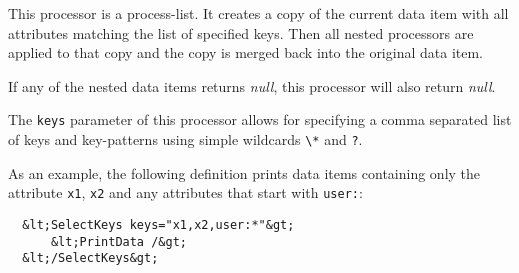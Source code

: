 
This processor is a process-list. It creates a copy of the current data
item with all attributes matching the list of specified keys. Then all
nested processors are applied to that copy and the copy is merged back
into the original data item.

If any of the nested data items returns \emph{null}, this processor will
also return \emph{null}.

The \texttt{keys} parameter of this processor allows for specifying a
comma separated list of keys and key-patterns using simple wildcards
\texttt{\textbackslash{}*} and \texttt{?}.

As an example, the following definition prints data items containing
only the attribute \texttt{x1}, \texttt{x2} and any attributes that
start with \texttt{user:}:

\begin{verbatim}
  &lt;SelectKeys keys="x1,x2,user:*"&gt; 
      &lt;PrintData /&gt;
  &lt;/SelectKeys&gt;
\end{verbatim}


\begin{table}[h]
\end{table}
